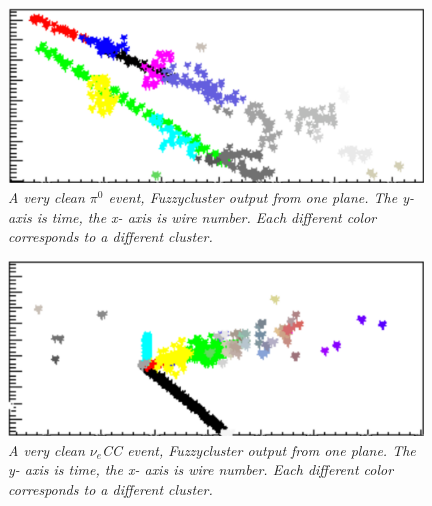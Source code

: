 \documentclass{article}
\begin{document}
\begin{figure}[h!]
\begin{center}
\includegraphics[width=110mm]{Figures/raw_fuzzy_pi0.png}
\end{center}
\caption{\textit{A very clean $\pi^0$ event, Fuzzycluster output from one plane. The y- axis is time, the x- axis is wire number. Each different color corresponds to a different cluster.}}
\label{raw_fuzzy_pi0_fig}
\end{figure}

\begin{figure}[h!]
\begin{center}
\includegraphics[width=110mm]{Figures/raw_fuzzy_nue.png}
\end{center}
\caption{\textit{A very clean $\nu_e$CC event, Fuzzycluster output from one plane. The y- axis is time, the x- axis is wire number. Each different color corresponds to a different cluster.}}
\label{raw_fuzzy_nue_fig}
\end{figure}
\end{document}
